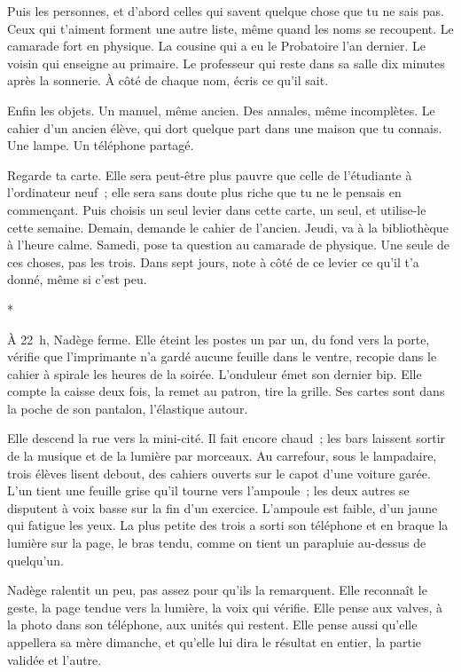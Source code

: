 \documentclass[10.5pt,twoside,openright]{book}
\newcommand{\asterisme}{\par\vspace{0.7em}\centerline{\color{gris}*\quad*\quad*}\vspace{0.7em}\par\noindent}
\begin{document}
Puis les personnes, et d’abord celles qui savent quelque chose que tu ne sais pas. Ceux qui t’aiment forment une autre liste, même quand les noms se recoupent. Le camarade fort en physique. La cousine qui a eu le Probatoire l’an dernier. Le voisin qui enseigne au primaire. Le professeur qui reste dans sa salle dix minutes après la sonnerie. À côté de chaque nom, écris ce qu’il sait.

Enfin les objets. Un manuel, même ancien. Des annales, même incomplètes. Le cahier d’un ancien élève, qui dort quelque part dans une maison que tu connais. Une lampe. Un téléphone partagé.

Regarde ta carte. Elle sera peut-être plus pauvre que celle de l’étudiante à l’ordinateur neuf ; elle sera sans doute plus riche que tu ne le pensais en commençant. Puis choisis un seul levier dans cette carte, un seul, et utilise-le cette semaine. Demain, demande le cahier de l’ancien. Jeudi, va à la bibliothèque à l’heure calme. Samedi, pose ta question au camarade de physique. Une seule de ces choses, pas les trois. Dans sept jours, note à côté de ce levier ce qu’il t’a donné, même si c’est peu.

\asterisme

À 22 h, Nadège ferme. Elle éteint les postes un par un, du fond vers la porte, vérifie que l’imprimante n’a gardé aucune feuille dans le ventre, recopie dans le cahier à spirale les heures de la soirée. L’onduleur émet son dernier bip. Elle compte la caisse deux fois, la remet au patron, tire la grille. Ses cartes sont dans la poche de son pantalon, l’élastique autour.

Elle descend la rue vers la mini-cité. Il fait encore chaud ; les bars laissent sortir de la musique et de la lumière par morceaux. Au carrefour, sous le lampadaire, trois élèves lisent debout, des cahiers ouverts sur le capot d’une voiture garée. L’un tient une feuille grise qu’il tourne vers l’ampoule ; les deux autres se disputent à voix basse sur la fin d’un exercice. L’ampoule est faible, d’un jaune qui fatigue les yeux. La plus petite des trois a sorti son téléphone et en braque la lumière sur la page, le bras tendu, comme on tient un parapluie au-dessus de quelqu’un.

Nadège ralentit un peu, pas assez pour qu’ils la remarquent. Elle reconnaît le geste, la page tendue vers la lumière, la voix qui vérifie. Elle pense aux valves, à la photo dans son téléphone, aux unités qui restent. Elle pense aussi qu’elle appellera sa mère dimanche, et qu’elle lui dira le résultat en entier, la partie validée et l’autre.
\end{document}
